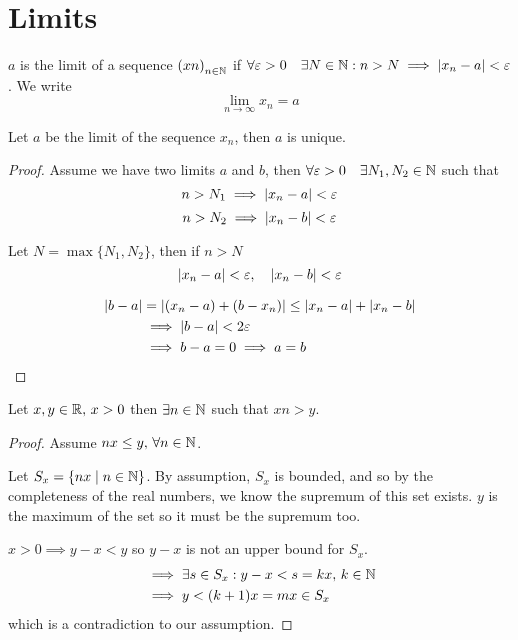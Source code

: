 \documentclass[a4paper,10pt]{article}
\begin{document}
\section{Limits}

\begin{defn}[Limit]
	$a$ is the limit of a sequence ${(xn)}_{n \in \mathbb{N}}$ if $\forall \varepsilon > 0 \quad \exists N \in \mathbb{N}: n > N \implies | x_n -a | < \varepsilon$.
	We write
	\[ \lim_{n \to \infty} x_n = a \]
\end{defn}

\begin{prop}
	Let $a$ be the limit of the sequence $x_n$, then $a$ is unique.
\end{prop}

\begin{proof}
	Assume we have two limits $a$ and $b$, then $\forall \varepsilon > 0
	\quad \exists N_1, N_2 \in \mathbb{N}$ such that
	\[ n > N_1 \implies |x_n - a| < \varepsilon \]
	\[ n > N_2 \implies |x_n - b| < \varepsilon \]

	Let $N = \max\{N_1, N_2\}$, then if $n > N$
	\[ |x_n - a| < \varepsilon, \quad |x_n - b| < \varepsilon \]

	\begin{align*}
		|b-a| &= |(x_n - a) + (b - x_n)| \leq |x_n - a| + |x_n - b| \\
		      &\implies |b-a| < 2\varepsilon \\
		      &\implies b - a = 0 \implies a = b
	\end{align*}
\end{proof}

\begin{thm}
	Let $x,y \in \mathbb{R}, \, x>0$ then $\exists n \in \mathbb{N}$ such that $xn > y$.
\end{thm}

\begin{proof}
	Assume $nx \leq y, \, \forall n \in \mathbb{N}$.

	Let $S_x = \{ nx \mid n \in \mathbb{N} \}$. By assumption, $S_x$ is
	bounded, and so by the completeness of the real numbers, we know
	the supremum of this set exists. $y$ is the maximum of the set
	so it must be the supremum too.

	$x > 0 \implies y-x < y$ so $y-x$ is not an upper bound for $S_x$.
	\begin{align*}
		&\implies \exists s \in S_x : y-x < s = kx, \, k \in \mathbb{N} \\
		&\implies y < (k+1)x = mx \in S_x
	\end{align*}
	which is a contradiction to our assumption.
\end{proof}
\end{document}
